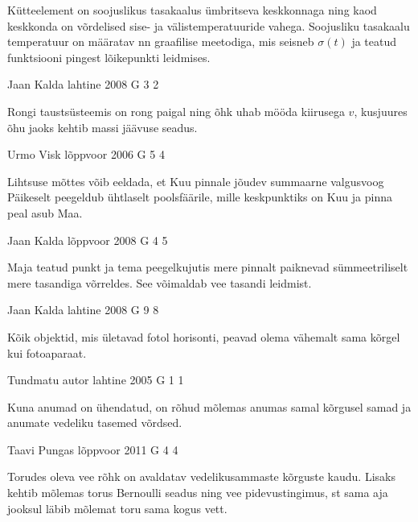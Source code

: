 \documentclass[11pt]{article}
\begin{document}
{{\ifHint
Kütteelement on soojuslikus tasakaalus ümbritseva keskkonnaga ning kaod keskkonda on võrdelised sise- ja välistemperatuuride vahega. Soojusliku tasakaalu temperatuur on määratav nn graafilise meetodiga, mis seisneb $\sigma (t)$ ja teatud funktsiooni pingest lõikepunkti leidmises.
\fi
}

{Jaan Kalda} %
{lahtine} %
{2008} %
{G 3} %
{2} %
{

\ifHint
Rongi taustsüsteemis on rong paigal ning õhk uhab mööda kiirusega $v$, kusjuures õhu jaoks kehtib massi jäävuse seadus.
\fi
}

{Urmo Visk} %
{lõppvoor} %
{2006} %
{G 5} %
{4} %
{

\ifHint
Lihtsuse mõttes võib eeldada, et Kuu pinnale jõudev summaarne valgusvoog Päikeselt peegeldub ühtlaselt poolsfäärile, mille keskpunktiks on Kuu ja pinna peal asub Maa.
\fi
}

{Jaan Kalda} %
{lõppvoor} %
{2008} %
{G 4} %
{5} %
{

\ifHint
Maja teatud punkt ja tema peegelkujutis mere pinnalt paiknevad sümmeetriliselt mere tasandiga võrreldes. See võimaldab vee tasandi leidmist.
\fi
}

{Jaan Kalda} %
{lahtine} %
{2008} %
{G 9} %
{8} %
{

\ifHint
Kõik objektid, mis ületavad fotol horisonti, peavad olema vähemalt sama kõrgel kui fotoaparaat.
\fi
}

{Tundmatu autor} %
{lahtine} %
{2005} %
{G 1} %
{1} %
{

\ifHint
Kuna anumad on ühendatud, on rõhud mõlemas anumas samal kõrgusel samad ja anumate vedeliku tasemed võrdsed.
\fi
}

{Taavi Pungas} %
{lõppvoor} %
{2011} %
{G 4} %
{4} %
{

\ifHint
Torudes oleva vee rõhk on avaldatav vedelikusammaste kõrguste kaudu. Lisaks kehtib mõlemas torus Bernoulli seadus ning vee pidevustingimus, st sama aja jooksul läbib mõlemat toru sama kogus vett.
\fi
}

}
\end{document}
